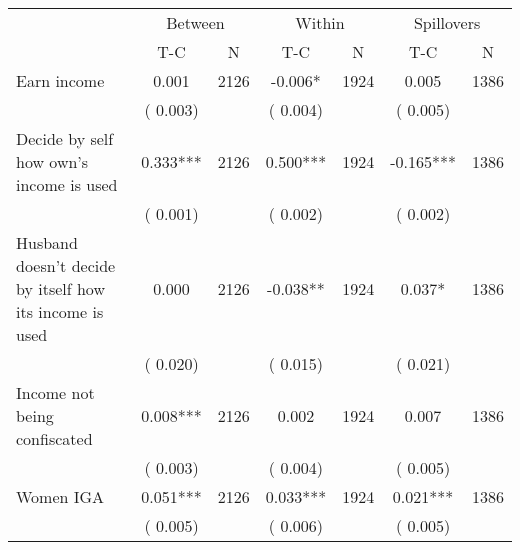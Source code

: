 
\begin{tabular}{l*{6}{c}}\hline&\multicolumn{2}{c}{Between}&\multicolumn{2}{c}{Within}&\multicolumn{2}{c}{Spillovers} \\ \cmidrule(r){2-3}\cmidrule(l){4-5}\cmidrule(l){6-7} & {T-C} & {N} & {T-C} & {N}  & {T-C}  & {N}  \\ \midrule
Earn income        &              0.001      &       2126       &             -0.006*      &       1924       &              0.005      &       1386       \\
                       &       (       0.003)            &                               &       (       0.004)            &                               &       (       0.005)            &                               \\
Decide by self how own's income is used        &              0.333***      &       2126       &              0.500***      &       1924       &             -0.165***      &       1386       \\
                       &       (       0.001)            &                               &       (       0.002)            &                               &       (       0.002)            &                               \\
Husband doesn't decide by itself how its income is used        &              0.000      &       2126       &             -0.038**      &       1924       &              0.037*      &       1386       \\
                       &       (       0.020)            &                               &       (       0.015)            &                               &       (       0.021)            &                               \\
Income not being confiscated        &              0.008***      &       2126       &              0.002      &       1924       &              0.007      &       1386       \\
                       &       (       0.003)            &                               &       (       0.004)            &                               &       (       0.005)            &                               \\
Women IGA        &              0.051***      &       2126       &              0.033***      &       1924       &              0.021***      &       1386       \\
                       &       (       0.005)            &                               &       (       0.006)            &                               &       (       0.005)            &                               \\
\hline \end{tabular}